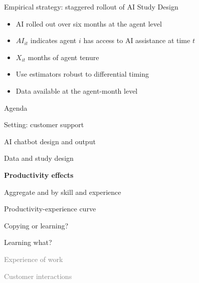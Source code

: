 \documentclass[aspectratio=169,t,11pt,table]{beamer}
\begin{document}
 \begin{frame}[label=studydesign]{Empirical strategy: staggered rollout of AI}
\alert{Study Design}
\begin{itemize} 
\item AI rolled out over six months at the agent level  
\item $AI_{it}$ indicates agent $i$ has access to AI assistance at time $t$
\item $ X_{it}$ months of agent tenure
\item Use estimators robust to differential timing
\item Data available at the agent-month level
\end{itemize}

\end{frame} 




\begin{frame}{Agenda}
\be
\item \textcolor{asher}{Setting: customer support}
\bi 
\item \textcolor{asher}{AI chatbot design and output}
\ei 
\medskip
\item \textcolor{asher}{Data and study design}
\medskip 
\item \textbf{Productivity effects}
\bi
\item Aggregate and by skill and experience
\item Productivity-experience curve
\item Copying or learning?
\item Learning what?
\ei 
\medskip
\item \textcolor{gray}{Experience of work}
\bi 
\item \textcolor{gray}{Customer interactions}
\ei 
\ee 
\end{frame} 
\end{document}
